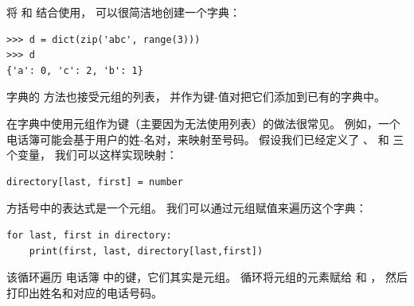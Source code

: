 {%

将  和 结合使用， 可以很简洁地创建一个字典：

\begin{lstlisting}
>>> d = dict(zip('abc', range(3)))
>>> d
{'a': 0, 'c': 2, 'b': 1}
\end{lstlisting}

%


字典的  方法也接受元组的列表， 并作为键-值对把它们添加到已有的字典中。

   
  


在字典中使用元组作为键（主要因为无法使用列表）的做法很常见。  
例如，一个电话簿可能会基于用户的姓-名对，来映射至号码。
假设我们已经定义了  、  和  三个变量，
我们可以这样实现映射：


\begin{lstlisting}
directory[last, first] = number
\end{lstlisting}

%

方括号中的表达式是一个元组。  
我们可以通过元组赋值来遍历这个字典：

\begin{lstlisting}
for last, first in directory:
    print(first, last, directory[last,first])
\end{lstlisting}

%

该循环遍历 电话簿 中的键，它们其实是元组。  
循环将元组的元素赋给  和  ， 然后打印出姓名和对应的电话号码。

}
